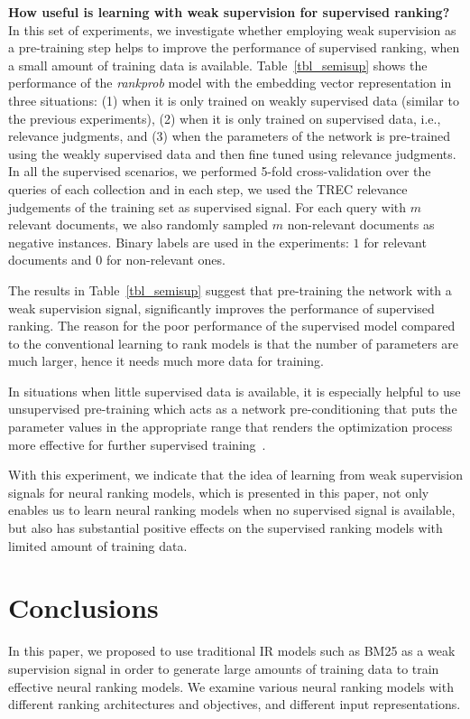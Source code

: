 \documentclass[sigconf]{acmart}
\newcommand{\modelthree}{\textit{rank\-prob} model\xspace}
\newcommand{\feedthree}{embedding vector representation\xspace}
\newcommand{\shrink}{\vspace{-1.5ex}}
\def\:{\hskip0pt} \newcommand{\mypar}[1]{\vspace*{-0.1ex}\medskip\noindent\textbf{#1}~}
\begin{document}
\mypar{How useful is learning with weak supervision for supervised ranking?}
In this set of experiments, we investigate whether employing weak supervision as a pre-training step helps to improve the performance of supervised ranking, when a small amount of training data is available. Table~\ref{tbl_semisup} shows the performance of the \modelthree with the \feedthree in three situations: (1) when it is only trained on weakly supervised data (similar to the previous experiments), (2) when it is only trained on supervised data, i.e., relevance judgments, and (3) when the parameters of the network is pre-trained using the weakly supervised data and then fine tuned using relevance judgments.
In all the supervised scenarios, we performed 5-fold cross-\:validation over the queries of each collection and in each step, we used the TREC relevance judgements of the training set as supervised signal. For each query with $m$ relevant documents, we also randomly sampled $m$ non-relevant documents as negative instances. Binary labels are used in the experiments: $1$ for relevant documents and $0$ for non-relevant ones.

The results in Table~\ref{tbl_semisup} suggest that pre-training the network with a weak supervision signal, significantly improves the performance of supervised ranking.
The reason for the poor performance of the supervised model compared to the conventional learning to rank models is that the number of parameters are much larger, hence it needs much more data for training.

In situations when little supervised data is available, it is especially helpful to use unsupervised pre-training which acts as a network pre-conditioning that puts the parameter values in the appropriate range that renders the optimization process more effective for further supervised training~\citep{Rrhan:2010}.

With this experiment, we indicate that the idea of learning from weak supervision signals for neural ranking models, which is presented in this paper, not only enables us to learn neural ranking models when no supervised signal is available, but also has substantial positive effects on the supervised ranking models with limited amount of training data. 

\shrink
\section{Conclusions}
In this paper, we proposed to use traditional IR models such as BM25 as a weak supervision signal in order to generate large amounts of training data to train effective neural ranking models.  
We examine various neural ranking models with different ranking architectures and objectives, and different input representations. 
\end{document}
